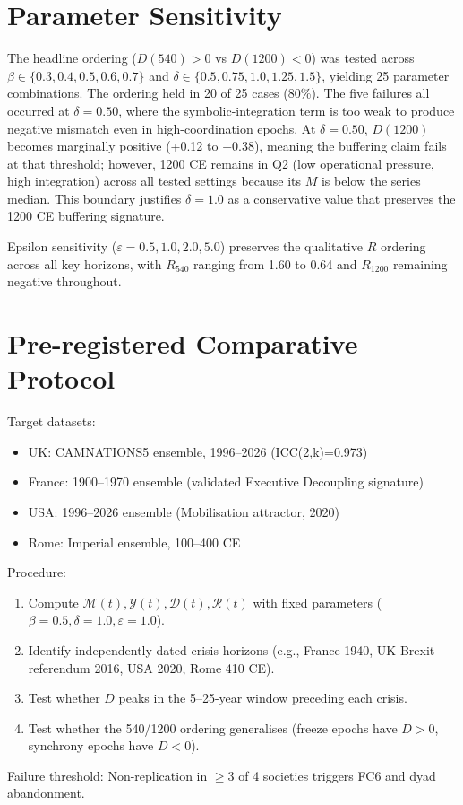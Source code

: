 \documentclass[11pt,a4paper]{article}
\begin{document}
\appendix

\section{Parameter Sensitivity}
The headline ordering (\(D(540)>0\) vs \(D(1200)<0\)) was tested across \(\beta\in\{0.3,0.4,0.5,0.6,0.7\}\) and \(\delta\in\{0.5,0.75,1.0,1.25,1.5\}\), yielding 25 parameter combinations. The ordering held in 20 of 25 cases (80\%). The five failures all occurred at \(\delta=0.50\), where the symbolic-integration term is too weak to produce negative mismatch even in high-coordination epochs. At \(\delta=0.50\), \(D(1200)\) becomes marginally positive (+0.12 to +0.38), meaning the buffering claim fails at that threshold; however, 1200 CE remains in Q2 (low operational pressure, high integration) across all tested settings because its \(M\) is below the series median. This boundary justifies \(\delta=1.0\) as a conservative value that preserves the 1200 CE buffering signature.

Epsilon sensitivity (\(\varepsilon=0.5,1.0,2.0,5.0\)) preserves the qualitative \(R\) ordering across all key horizons, with \(R_{540}\) ranging from 1.60 to 0.64 and \(R_{1200}\) remaining negative throughout.

\section{Pre-registered Comparative Protocol}
Target datasets:

\begin{itemize}
\item UK: CAMNATIONS5 ensemble, 1996--2026 (ICC(2,k)=0.973)
\item France: 1900--1970 ensemble (validated Executive Decoupling signature)
\item USA: 1996--2026 ensemble (Mobilisation attractor, 2020)
\item Rome: Imperial ensemble, 100--400 CE
\end{itemize}

Procedure:

\begin{enumerate}
\item Compute \(\mathcal{M}(t),\mathcal{Y}(t),\mathcal{D}(t),\mathcal{R}(t)\) with fixed parameters (\(\beta=0.5,\delta=1.0,\varepsilon=1.0\)).
\item Identify independently dated crisis horizons (e.g., France 1940, UK Brexit referendum 2016, USA 2020, Rome 410 CE).
\item Test whether \(D\) peaks in the 5--25-year window preceding each crisis.
\item Test whether the 540/1200 ordering generalises (freeze epochs have \(D>0\), synchrony epochs have \(D<0\)).
\end{enumerate}

Failure threshold: Non-replication in \(\geq3\) of 4 societies triggers FC6 and dyad abandonment.
\end{document}
